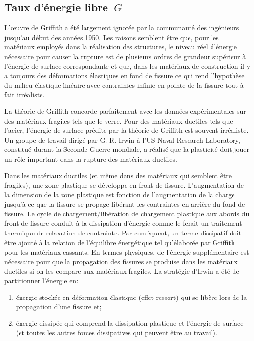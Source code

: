 \medskip
\subsection{Taux d'énergie libre~$G$}

\medskip
\begin{histoire}%
L'œuvre de Griffith a été largement ignorée par la communauté des ingénieurs jusqu'au début des années 1950. Les raisons semblent être que, pour les matériaux employés dans la réalisation des structures, le niveau réel d'énergie nécessaire pour causer la rupture est de plusieurs ordres de grandeur supérieur à l'énergie de surface correspondante et que, dans les matériaux de construction il y a toujours des déformations élastiques en fond de fissure ce qui rend l'hypothèse du milieu élastique linéaire avec contraintes infinie en pointe de la fissure tout à fait irréaliste.

\medskip
La théorie de Griffith concorde parfaitement avec les données expérimentales sur des matériaux fragiles tels que le verre. Pour des matériaux ductiles tels que l'acier, l'énergie de surface prédite par la théorie de Griffith est souvent irréaliste. Un groupe de travail dirigé par G. R. Irwin à l'US Naval Research Laboratory, constitué durant la Seconde Guerre mondiale, a réalisé que la plasticité doit jouer un rôle important dans la rupture des matériaux ductiles.

\medskip
Dans les matériaux ductiles (et même dans des matériaux qui semblent être fragiles), une zone plastique se développe en front de fissure. L'augmentation de la dimension de la zone plastique est fonction de l'augmentation de la charge jusqu'à ce que la fissure se propage libérant les contraintes en arrière du fond de fissure. Le cycle de chargement/libération de chargement plastique aux abords du front de fissure conduit à la dissipation d'énergie comme le ferait un traitement thermique de relaxation de contrainte. Par conséquent, un terme dissipatif doit être ajouté à la relation de l'équilibre énergétique tel qu'élaborée par Griffith pour les matériaux cassants. En termes physiques, de l'énergie supplémentaire est nécessaire pour que la propagation des fissures se produise dans les matériaux ductiles si on les compare aux matériaux fragiles.
\medskipvm
La stratégie d'Irwin a été de partitionner l'énergie en:
\begin{enumerate}
\item énergie stockée en déformation élastique (effet ressort) qui se libère lors de la propagation d'une fissure et;
\item énergie dissipée qui comprend la dissipation plastique et l'énergie de surface (et toutes les autres forces dissipatives qui peuvent être au travail).
\end{enumerate}
\end{histoire}

